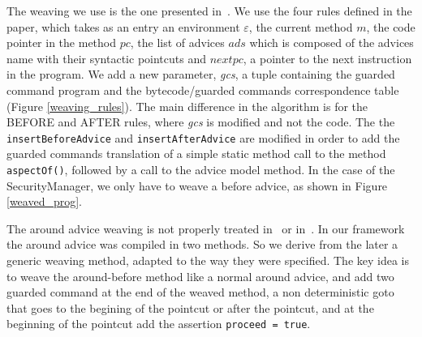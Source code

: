 The weaving we use is the one presented in~\cite{weaving06}. We use the four
 rules defined in the paper, which takes as an entry an environment 
$\varepsilon$, the current method $m$, the code pointer in the method $pc$,
the list of advices $ads$ which is composed of the advices name with their
syntactic pointcuts and $nextpc$, a pointer to the next instruction in the
program.
We add a new parameter, {\it gcs},
a tuple containing the  guarded command program and 
the bytecode/guarded commands correspondence table 
(Figure \ref{weaving_rules}). The main difference
in the algorithm is for the {\small  BEFORE} and {\small AFTER} rules, where
{\it gcs} is modified and not the code. The the {\tt insertBeforeAdvice} and 
{\tt insertAfterAdvice} are modified in order to add the guarded commands
translation of a simple static method call to the method {\tt aspectOf()}, 
followed by a call to the advice model method. In the case of the 
SecurityManager, we only have to weave a before advice, as shown in Figure
\ref{weaved_prog}.


The around advice weaving is not properly treated in~\cite{weaving06}
 or in~\cite{weaving04}. In our framework the around advice was
 compiled in two methods. So we derive from the later a generic
 weaving method, adapted to the way they were specified. The key idea is
to weave the around-before method like a normal around advice, and add
two guarded command at the end of the weaved method, a non deterministic goto
that goes to the begining of the pointcut or after the pointcut, and at the 
beginning of the pointcut add the assertion {\tt proceed = true}.


